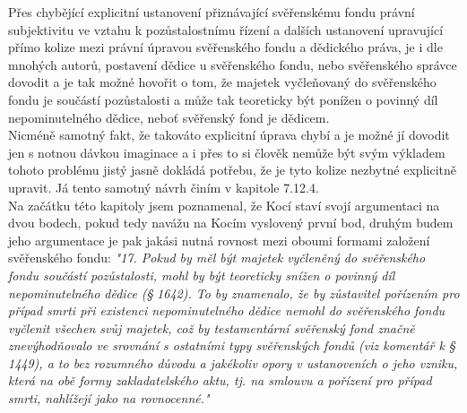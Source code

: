 \documentclass{article}
\begin{document}
 Přes chybějící explicitní ustanovení přiznávající svěřenskému fondu právní subjektivitu ve vztahu k pozůstalostnímu řízení a dalších ustanovení upravující přímo kolize mezi právní úpravou svěřenského fondu a dědického práva, je i dle mnohých autorů, postavení dědice u svěřenského fondu, nebo svěřenského správce dovodit a je tak možné hovořit o tom, že majetek vyčleňovaný do svěřenského fondu je součástí pozůstalosti a může tak teoreticky být ponížen o povinný díl nepominutelného dědice, neboť svěřenský fond je dědicem.\\
 
 Nicméně samotný fakt, že takováto explicitní úprava chybí a je možné jí dovodit jen s notnou dávkou imaginace a i přes to si člověk nemůže být svým výkladem tohoto problému jistý jasně dokládá potřebu, že je tyto kolize nezbytné explicitně upravit. Já tento samotný návrh činím v kapitole 7.12.4.\\
 
 Na začátku této kapitoly jsem poznamenal, že Kocí staví svojí argumentaci na dvou bodech, pokud tedy navážu na Kocím vyslovený první bod, druhým budem jeho argumentace je pak jakási nutná rovnost mezi oboumi formami založení svěřenského fondu: \textit{"17. Pokud by měl být majetek vyčleněný do svěřenského fondu součástí pozů­stalosti, mohl by být teoreticky snížen o povinný díl nepominutelného dědice (§ 1642). To by znamenalo, že by zůstavitel pořízením pro případ smrti při existenci nepominutelného dědice nemohl do svěřenského fondu vyčlenit všechen svůj majetek, což by testamentární svěřenský fond značně znevýhodňovalo ve srovnání s ostatními typy svěřenských fondů (viz komentář k § 1449), a to bez rozumného důvodu a jakékoliv opory v ustanoveních o jeho vzniku, která na obě formy zakladatelského aktu, tj. na smlouvu a pořízení pro případ smrti, nahlížejí jako na rovnocenné."}\\
 
\end{document}
